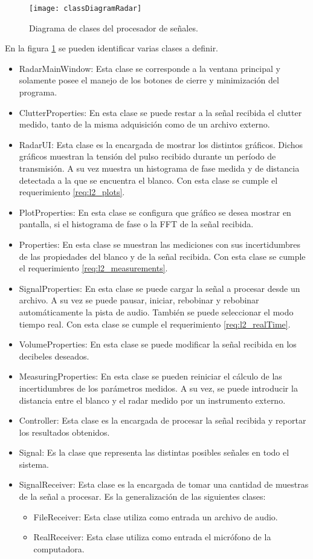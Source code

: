 \begin{figure}
 \centering
 \texttt{[image: classDiagramRadar]}
 \caption{Diagrama de clases del procesador de señales.}
 \label{fig:RadarsClassDiagram}
\end{figure}
En la figura \ref{fig:RadarsClassDiagram} se pueden identificar varias clases a definir.
\begin{itemize}
  \item RadarMainWindow: Esta clase se corresponde a la ventana principal y solamente posee el manejo de los botones de cierre y minimización del programa.
  \item ClutterProperties: En esta clase se puede restar a la señal recibida el clutter medido, tanto de la misma adquisición como de un archivo externo.
  \item RadarUI: Esta clase es la encargada de mostrar los distintos gráficos. Dichos gráficos muestran la tensión del pulso recibido durante un período de transmisión. A su vez muestra un histograma de fase medida y de distancia detectada a la que se encuentra el blanco. Con esta clase se cumple el requerimiento \ref{req:l2_plots}.
  \item PlotProperties: En esta clase se configura que gráfico se desea mostrar en pantalla, si el histograma de fase o la FFT de la señal recibida.
  \item Properties: En esta clase se muestran las mediciones con sus incertidumbres de las propiedades del blanco y de la señal recibida. Con esta clase se cumple el requerimiento \ref{req:l2_measurements}.
  \item SignalProperties: En esta clase se puede cargar la señal a procesar desde un archivo. A su vez se puede pausar, iniciar, rebobinar y rebobinar automáticamente la pista de audio. También se puede seleccionar el modo tiempo real. Con esta clase se cumple el requerimiento \ref{req:l2_realTime}.
  \item VolumeProperties: En esta clase se puede modificar la señal recibida en los decibeles deseados.
  \item MeasuringProperties:  En esta clase se pueden reiniciar el cálculo de las incertidumbres de los parámetros medidos. A su vez, se puede introducir la distancia entre el blanco y el radar medido por un instrumento externo.
  \item Controller: Esta clase es la encargada de procesar la señal recibida y reportar los resultados obtenidos.
  \item Signal: Es la clase que representa las distintas posibles señales en todo el sistema.
  \item SignalReceiver: Esta clase es la encargada de tomar una cantidad de muestras de la señal a procesar. Es la generalización de las siguientes clases:
  \begin{itemize}
    \item FileReceiver: Esta clase utiliza como entrada un archivo de audio.
    \item RealReceiver: Esta clase utiliza como entrada el micrófono de la computadora.
  \end{itemize}
\end{itemize}


